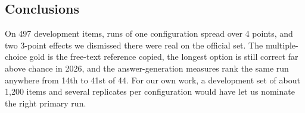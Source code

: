 \documentclass[sigconf,nonacm]{acmart}
\begin{document}
\subsection{Conclusions}

On 497 development items, runs of one configuration spread over 4 points, and
two 3-point effects we dismissed there were real on the official set. The
multiple-choice gold is the free-text reference copied, the longest option is
still correct far above chance in 2026, and the answer-generation measures rank
the same run anywhere from 14th to 41st of 44. For our own work, a development set of about 1,200 items and several replicates per configuration
would have let us nominate the right primary run.



\end{document}
